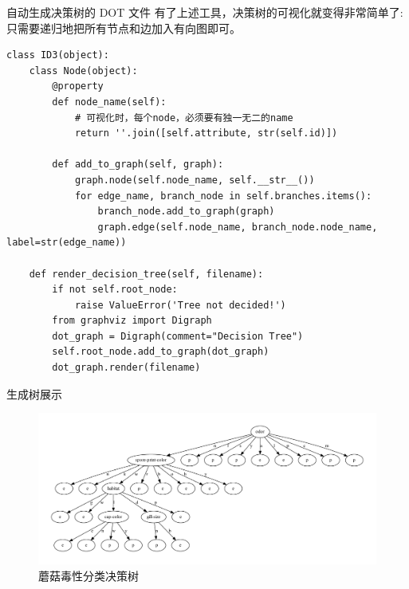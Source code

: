 \documentclass[10pt]{beamer}
\begin{document}
\begin{frame}{自动生成决策树的 DOT 文件}
有了上述工具，决策树的可视化就变得非常简单了:只需要递归地把所有节点和边加入有向图即可。
\begin{verbatim}
class ID3(object):
    class Node(object):
        @property
        def node_name(self):
            # 可视化时，每个node，必须要有独一无二的name
            return ''.join([self.attribute, str(self.id)])

        def add_to_graph(self, graph):
            graph.node(self.node_name, self.__str__())
            for edge_name, branch_node in self.branches.items():
                branch_node.add_to_graph(graph)
                graph.edge(self.node_name, branch_node.node_name, label=str(edge_name))

    def render_decision_tree(self, filename):
        if not self.root_node:
            raise ValueError('Tree not decided!')   
        from graphviz import Digraph
        dot_graph = Digraph(comment="Decision Tree")
        self.root_node.add_to_graph(dot_graph)
        dot_graph.render(filename)                    
\end{verbatim}
\end{frame}

\begin{frame}[allowframebreaks]{生成树展示}
\begin{figure}[H]
  \includegraphics[width=\textwidth]{../mushroom_data/dtree.pdf}
  \caption{蘑菇毒性分类决策树}
\end{figure}       
\end{frame}
\end{document}
